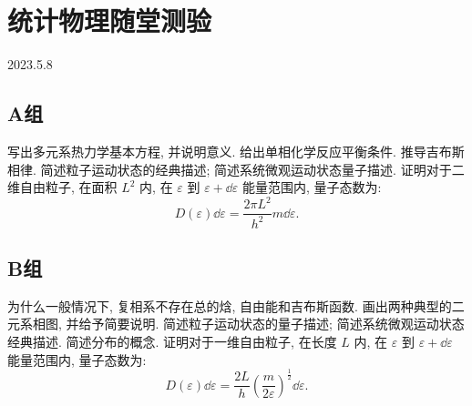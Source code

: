 \section{统计物理随堂测验}
2023.5.8
\subsection{A组}
\begin{questions}
  \question 写出多元系热力学基本方程, 并说明意义.
  \question 给出单相化学反应平衡条件.
  \question 推导吉布斯相律.
  \question 简述粒子运动状态的经典描述; 简述系统微观运动状态量子描述.
  \question 证明对于二维自由粒子, 在面积 $L^2$ 内, 在 $\varepsilon$ 到 $\varepsilon+\dd \varepsilon$ 能量范围内, 量子态数为:
  \begin{equation}
    D(\varepsilon)\dd \varepsilon = \frac{2\pi L^2}{h^2}m \dd \varepsilon.
  \end{equation}
\end{questions}

\subsection{B组}
\begin{questions}
  \question 为什么一般情况下, 复相系不存在总的焓, 自由能和吉布斯函数.
  \question 画出两种典型的二元系相图, 并给予简要说明.
  \question 简述粒子运动状态的量子描述; 简述系统微观运动状态经典描述.
  \question 简述分布的概念.
  \question 证明对于一维自由粒子, 在长度 $L$ 内, 在 $\varepsilon$ 到 $\varepsilon+\dd \varepsilon$ 能量范围内, 量子态数为:
  \begin{equation}
D(\varepsilon)\dd \varepsilon = \frac{2L}{h} \left( \frac{m}{2 \varepsilon} \right)^{\frac{1}{2}}\dd \varepsilon.
  \end{equation}

\end{questions}
